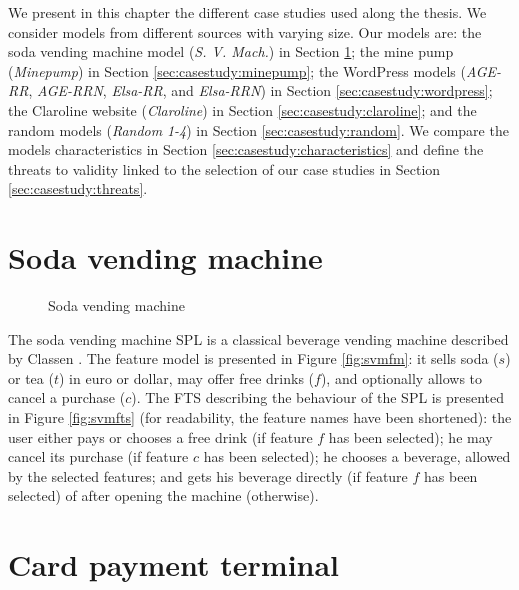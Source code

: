 
We present in this chapter the different case studies used along the thesis. We consider models from different sources with varying size. 
Our models are: 
%
the soda vending machine model (\textit{S. V. Mach.}) in Section \ref{sec:casestudy:svm};
%
the mine pump (\textit{Mine\-pump}) in Section \ref{sec:casestudy:minepump};
%
the WordPress models (\textit{AGE-RR}, \textit{AGE-RRN}, \textit{Elsa-RR}, and \textit{Elsa-RRN}) in Section \ref{sec:casestudy:wordpress};
%
the Claroline website (\textit{Claroline}) in Section \ref{sec:casestudy:claroline};
%
and the random models (\textit{Random} \textit{1-4}) in Section \ref{sec:casestudy:random}.
%
We compare the models characteristics in Section \ref{sec:casestudy:characteristics} and define the threats to validity linked to the selection of our case studies in Section \ref{sec:casestudy:threats}.


\section{Soda vending machine}

\label{sec:casestudy:svm}

\begin{figure}[t]
	\centering
	\caption{Soda vending machine}
\end{figure}

The \gls{soda vending machine} SPL is a classical beverage vending machine described by Classen \etal \cite{Classen2013b}. The \gls{feature model} is presented in Figure \ref{fig:svmfm}: it sells soda ($s$) or tea ($t$) in euro or dollar, may offer free drinks ($f$), and optionally allows to cancel a purchase ($c$). The \gls{FTS} describing the behaviour of the SPL is presented in Figure \ref{fig:svmfts} (for readability, the feature names have been shortened): the user either pays or chooses a free drink (if feature $f$ has been selected); he may cancel its purchase (if feature $c$ has been selected); he chooses a beverage, allowed by the selected features; and gets his beverage directly (if feature $f$ has been selected) of after opening the machine (otherwise).


\section{Card payment terminal}

